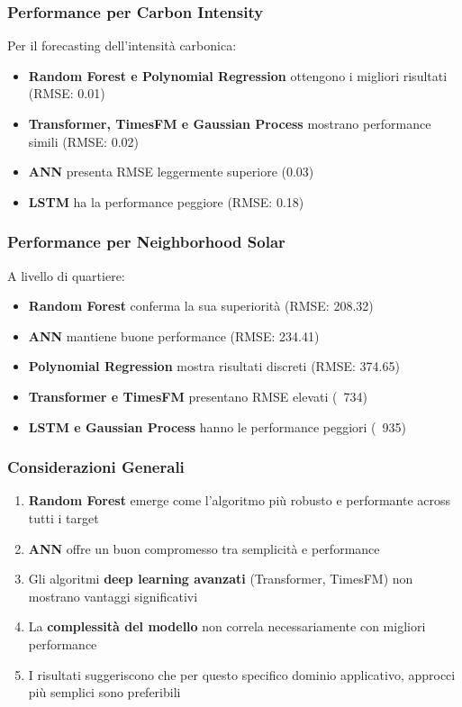 \documentclass[12pt,a4paper,twoside]{report}
\begin{document}
\begin{appendices}
\subsubsection{Performance per Carbon Intensity}
Per il forecasting dell'intensità carbonica:
\begin{itemize}
    \item \textbf{Random Forest e Polynomial Regression} ottengono i migliori risultati (RMSE: 0.01)
    \item \textbf{Transformer, TimesFM e Gaussian Process} mostrano performance simili (RMSE: 0.02)
    \item \textbf{ANN} presenta RMSE leggermente superiore (0.03)
    \item \textbf{LSTM} ha la performance peggiore (RMSE: 0.18)
\end{itemize}

\subsubsection{Performance per Neighborhood Solar}
A livello di quartiere:
\begin{itemize}
    \item \textbf{Random Forest} conferma la sua superiorità (RMSE: 208.32)
    \item \textbf{ANN} mantiene buone performance (RMSE: 234.41)
    \item \textbf{Polynomial Regression} mostra risultati discreti (RMSE: 374.65)
    \item \textbf{Transformer e TimesFM} presentano RMSE elevati (~734)
    \item \textbf{LSTM e Gaussian Process} hanno le performance peggiori (~935)
\end{itemize}

\subsubsection{Considerazioni Generali}
\begin{enumerate}
    \item \textbf{Random Forest} emerge come l'algoritmo più robusto e performante across tutti i target
    \item \textbf{ANN} offre un buon compromesso tra semplicità e performance
    \item Gli algoritmi \textbf{deep learning avanzati} (Transformer, TimesFM) non mostrano vantaggi significativi
    \item La \textbf{complessità del modello} non correla necessariamente con migliori performance
    \item I risultati suggeriscono che per questo specifico dominio applicativo, approcci più semplici sono preferibili
\end{enumerate}


\end{appendices}
\end{document}
